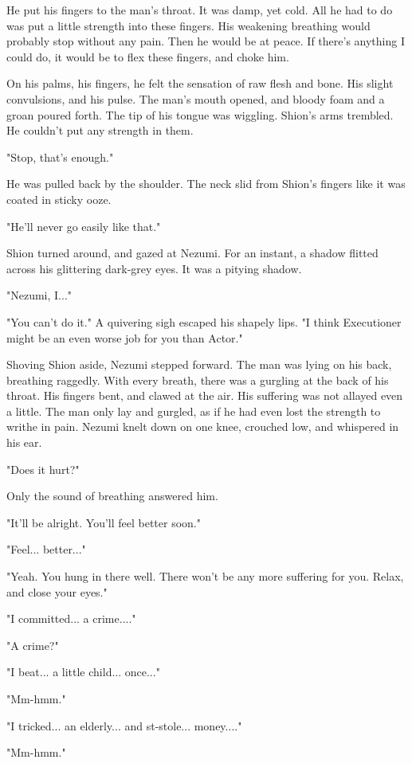 He put his fingers to the man's throat. It was damp, yet cold. All he
had to do was put a little strength into these fingers. His weakening
breathing would probably stop without any pain. Then he would be at
peace. If there's anything I could do, it would be to flex these
fingers, and choke him.

On his palms, his fingers, he felt the sensation of raw flesh and bone.
His slight convulsions, and his pulse. The man's mouth opened, and
bloody foam and a groan poured forth. The tip of his tongue was
wiggling. Shion's arms trembled. He couldn't put any strength in them.

"Stop, that's enough."

He was pulled back by the shoulder. The neck slid from Shion's fingers
like it was coated in sticky ooze.

"He'll never go easily like that."

Shion turned around, and gazed at Nezumi. For an instant, a shadow
flitted across his glittering dark-grey eyes. It was a pitying shadow.

"Nezumi, I..."

"You can't do it." A quivering sigh escaped his shapely lips. "I think
Executioner might be an even worse job for you than Actor."

Shoving Shion aside, Nezumi stepped forward. The man was lying on his
back, breathing raggedly. With every breath, there was a gurgling at the
back of his throat. His fingers bent, and clawed at the air. His
suffering was not allayed even a little. The man only lay and gurgled,
as if he had even lost the strength to writhe in pain. Nezumi knelt down
on one knee, crouched low, and whispered in his ear.

"Does it hurt?"

Only the sound of breathing answered him.

"It'll be alright. You'll feel better soon."

"Feel... better..."

"Yeah. You hung in there well. There won't be any more suffering for
you. Relax, and close your eyes."

"I committed... a crime...."

"A crime?"

"I beat... a little child... once..."

"Mm-hmm."

"I tricked... an elderly... and st-stole... money...."

"Mm-hmm."

